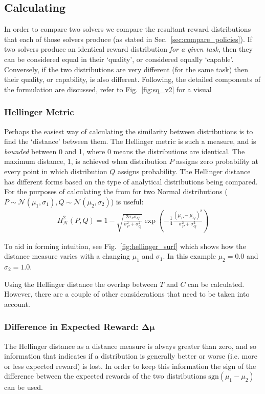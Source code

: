 \subsection{Calculating \xQ}
In order to compare two solvers we compare the resultant reward distributions that each of those solvers produce (as stated in Sec.~\ref{sec:compare_policies}). If two solvers produce an identical reward distribution \emph{for a given task}, then they can be considered equal in their `quality', or considered equally `capable'. Conversely, if the two distributions are very different (for the same task) then their quality, or capability, is also different. Following, the detailed components of the \xQ{} formulation are discussed, refer to Fig.~\ref{fig:sq_v2} for a visual 

\subsubsection{Hellinger Metric} \label{sec:hellinger}
Perhaps the easiest way of calculating the similarity between distributions is to find the `distance' between them. The Hellinger metric is such a measure, and is \emph{bounded} between 0 and 1, where 0 means the distributions are identical. The maximum distance, 1, is achieved when distribution $P$ assigns zero probability at every point in which distribution $Q$ assigns probability.  The Hellinger distance has different forms based on the type of analytical distributions being compared. For the purposes of calculating \xQ{} the from for two Normal distributions ($P \sim \mathcal{N}(\mu_1,\sigma_1), Q\sim\mathcal{N}(\mu_2,\sigma_2)$) is useful:
\begin{align}
    H_{\mathcal{N}}^{2}(P,Q) = 1-\sqrt{\frac{2\sigma_P\sigma_Q}{\sigma_P^2+\sigma_Q^2}}\exp{\left(-\frac{1}{4}\frac{(\mu_P-\mu_Q)^2}{\sigma_P^2+\sigma_Q^2}\right)}
\end{align}

To aid in forming intuition, see Fig.~\ref{fig:hellinger_surf} which shows how the distance measure varies with a changing $\mu_1$ and $\sigma_1$. In this example $\mu_2=0.0$ and $\sigma_2=1.0$.

Using the Hellinger distance the overlap between $T$ and $C$ can be calculated. However, there are a couple of other considerations that need to be taken into account. 

\subsubsection{Difference in Expected Reward: $\pmb{\Delta \mu}$}
The Hellinger distance as a distance measure is always greater than zero, and so information that indicates if a distribution is generally better or worse (i.e. more or less expected reward) is lost. In order to keep this information the sign of the difference between the expected rewards of the two distributions $\text{sgn}(\mu_1-\mu_2)$ can be used.

